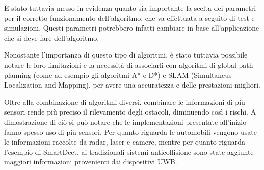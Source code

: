 \documentclass[Lau, binding=0.6cm, oneside]{sapthesis}
\begin{document}
È stato tuttavia messo in evidenza quanto sia importante la scelta dei parametri per il corretto funzionamento dell'algoritmo, che va effettuata a seguito di test e simulazioni.
Questi parametri potrebbero infatti cambiare in base all'applicazione che si deve fare dell'algoritmo.

Nonostante l'importanza di questo tipo di algoritmi, è stato tuttavia possibile notare le loro limitazioni e la necessità di associarli con algoritmi di global path planning (come ad esempio gli algoritmi A* e D*) e SLAM (Simultaneus Localization and Mapping), per avere una accuratezza e delle prestazioni migliori.

Oltre alla combinazione di algoritmi diversi, combinare le informazioni di più sensori rende più preciso il rilevamento degli ostacoli, diminuendo così i rischi.
A dimostrazione di ciò si può notare che le implementazioni presentate all'inizio fanno spesso uso di più sensori.
Per quanto riguarda le automobili vengono usate le informazioni raccolte da radar, laser e camere, mentre per quanto riguarda l'esempio di SmartDect, ai tradizionali sistemi anticollisione sono state aggiunte maggiori informazioni provenienti dai dispositivi UWB.



\end{document}
